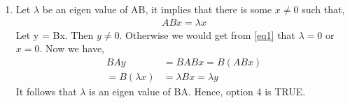 \documentclass[journal,12pt,twocolumn]{IEEEtran}
\begin{document}
\begin{enumerate}
    \item Let $\lambda$ be an eigen value of AB, it implies that there is some $x \neq 0$ such that,
    \begin{align}
        ABx = \lambda x \label{eq1}
    \end{align}
    Let y = Bx. Then $y \neq 0$. Otherwise we would get from \eqref{eq1} that $\lambda = 0$ or $x = 0$. Now we have,
    \begin{align}
        BAy &= BABx = B(ABx)  \nonumber \\
         = B(\lambda x) &= \lambda Bx = \lambda y \nonumber
    \end{align}
    It follows that $\lambda$ is an eigen value of BA. Hence, option 4 is TRUE.
\end{enumerate}
\end{document}
